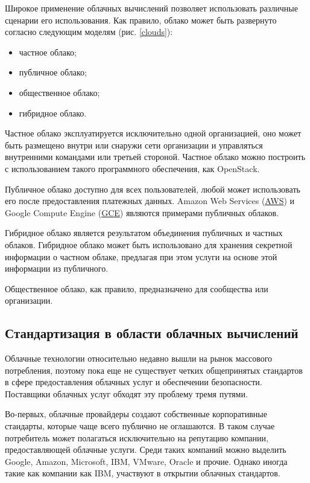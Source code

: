 Широкое применение облачных вычислений позволяет использовать различные сценарии его использования.
Как правило, облако может быть развернуто согласно следующим моделям (рис. \ref{clouds}):
\begin{itemize}
  \item частное облако;
  \item публичное облако;
  \item общественное облако;
  \item гибридное облако.
\end{itemize}


Частное облако эксплуатируется исключительно одной организацией, оно может быть размещено внутри или снаружи сети организации и управляться внутренними командами или третьей стороной.
Частное облако можно построить с использованием такого программного обеспечения, как OpenStack.

Публичное облако доступно для всех пользователей, любой может использовать его после предоставления платежных данных.
Amazon Web Services (\hyperlink{aws}{AWS}) и Google Compute Engine (\hyperlink{gce}{GCE}) являются примерами публичных облаков.

Гибридное облако является результатом объединения публичных и частных облаков.
Гибридное облако может быть использовано для хранения секретной информации о частном облаке, предлагая при этом услуги на основе этой информации из публичного.

Общественное облако, как правило, предназначено для сообщества или организации.

\subsection{Стандартизация в области облачных вычислений}

Облачные технологии относительно недавно вышли на рынок массового потребления, поэтому пока еще не существует четких общепринятых стандартов в сфере предоставления облачных услуг и обеспечении безопасности.
Поставщики облачных услуг обходят эту проблему тремя путями.

Во-первых, облачные провайдеры создают собственные корпоративные стандарты, которые чаще всего публично не оглашаются.
В таком случае потребитель может полагаться исключительно на репутацию компании, предоставляющей облачные услуги.
Среди таких компаний можно выделить Google, Amazon, Microsoft, IBM, VMware, Oracle и прочие.
Однако иногда такие как компании как IBM, участвуют в открытии облачных стандартов.

